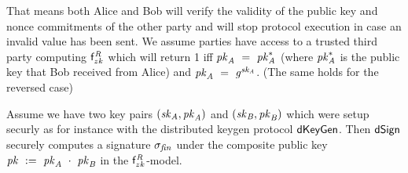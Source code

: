 That means both Alice and Bob will verify the validity of the public key and nonce commitments of the other party and will stop protocol execution in case an invalid value has been sent.
We assume parties have access to a trusted third party computing $\mathsf{f}^{\mathit{R}}_{zk}$ which will return 1 iff $\mathit{pk}_{\mathit{A}} ~=~ \mathit{pk}_{\mathit{A}}^*$ (where $\mathit{pk}_{\mathit{A}}^*$ is the public key that Bob received from Alice) and $\mathit{pk}_{\mathit{A}} ~=~ \mathit{g}^{\mathit{sk}_{\mathit{A}}}$. (The same holds for the reversed case)

\begin{theorem}\label{lem:sig:security}
Assume we have two key pairs $(\mathit{sk}_{\mathit{A}}, \mathit{pk}_{\mathit{A}})$ and $(\mathit{sk}_{\mathit{B}}, \mathit{pk}_{\mathit{B}})$ which were setup securly as for instance with the distributed keygen protocol $\mathsf{dKeyGen}$.
    Then $\mathsf{dSign}$ securely computes a signature $\sigma_{\mathit{fin}}$ under the composite public key $\mathit{pk} ~:=~ \mathit{pk}_{\mathit{A}} ~\cdot~ \mathit{pk}_{\mathit{B}}$ in the $\mathsf{f}^{\mathit{R}}_{zk}$-model.
\end{theorem}


